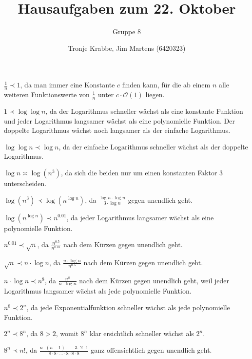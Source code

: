 \documentclass[10pt,a4paper,oneside,ngerman,numbers=noenddot]{scrartcl}
\begin{document}
\author{Tronje Krabbe, Jim Martens (6420323)}
\title{Hausaufgaben zum 22. Oktober}
\subtitle{Gruppe 8}
\maketitle
\section{} %
	\subsection{} %
	$\frac{1}{n} \prec 1$, da man immer eine Konstante $c$ finden kann, für die ab einem $n$ alle weiteren Funktionswerte von $\frac{1}{n}$ unter $c \cdot \mathcal{O}(1)$ liegen.
	
	$1 \prec \log\log n$, da der Logarithmus schneller wächst als eine konstante Funktion und jeder Logarithmus langsamer wächst als eine polynomielle Funktion. Der doppelte Logarithmus wächst noch langsamer als der einfache Logarithmus.
	
	$\log\log n \prec \log n$, da der einfache Logarithmus schneller wächst als der doppelte Logarithmus.
	
	$\log n \asymp \log(n^{3})$, da sich die beiden nur um einen konstanten Faktor $3$ unterscheiden.
	
	$\log(n^{3}) \prec \log(n^{\log n})$, da $\frac{\log n \cdot \log n}{3 \cdot \log n}$ gegen unendlich geht.
	
	$\log(n^{\log n}) \prec n^{0.01}$, da jeder Logarithmus langsamer wächst als eine polynomielle Funktion.
	
	$n^{0.01} \prec \sqrt{n}$, da $\frac{n^{0.5}}{n^{0.01}}$ nach dem Kürzen gegen unendlich geht.
	
	$\sqrt{n} \prec n \cdot \log n$, da $\frac{n \cdot \log n}{n^{0.5}}$ nach dem Kürzen gegen unendlich geht.
	
	$n \cdot \log n \prec n^{8}$, da $\frac{n^{8}}{n \cdot \log n}$ nach dem Kürzen gegen unendlich geht, weil jeder Logarithmus langsamer wächst als jede polynomielle Funktion.
	
	$n^{8} \prec 2^{n}$, da jede Exponentialfunktion schneller wächst als jede polynomielle Funktion.
	
	$2^{n} \prec 8^{n}$, da $8 > 2$, womit $8^{n}$ klar ersichtlich schneller wächst als $2^{n}$.
	
	$8^{n} \prec n!$, da $\frac{n \cdot (n-1) \cdot ... \cdot 3 \cdot 2 \cdot 1}{8 \cdot 8 \cdot ... \cdot 8 \cdot 8 \cdot 8}$ ganz offensichtlich gegen unendlich geht.
	
\end{document}
